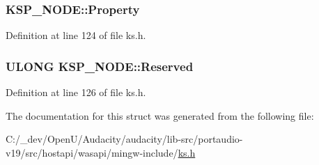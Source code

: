 \subsubsection[{\texorpdfstring{Property}{Property}}]{ K\+S\+P\+\_\+\+N\+O\+D\+E\+::\+Property}\hypertarget{struct_k_s_p___n_o_d_e_a0e2b497a39af6ec103993e2b548a9069}{}\label{struct_k_s_p___n_o_d_e_a0e2b497a39af6ec103993e2b548a9069}


Definition at line 124 of file ks.\+h.

\subsubsection[{\texorpdfstring{Reserved}{Reserved}}]{\setlength{\rightskip}{0pt plus 5cm}U\+L\+O\+NG K\+S\+P\+\_\+\+N\+O\+D\+E\+::\+Reserved}\hypertarget{struct_k_s_p___n_o_d_e_abd97f57056040865bdf319f9a43030c7}{}\label{struct_k_s_p___n_o_d_e_abd97f57056040865bdf319f9a43030c7}


Definition at line 126 of file ks.\+h.



The documentation for this struct was generated from the following file\+:\begin{DoxyCompactItemize}
\item 
C\+:/\+\_\+dev/\+Open\+U/\+Audacity/audacity/lib-\/src/portaudio-\/v19/src/hostapi/wasapi/mingw-\/include/\hyperlink{ks_8h}{ks.\+h}\end{DoxyCompactItemize}
